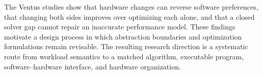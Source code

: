 The Ventus studies show that hardware changes can reverse software preferences, that changing both sides improves over optimizing each alone, and that a closed solver gap cannot repair an inaccurate performance model. These findings motivate a design process in which abstraction boundaries and optimization formulations remain revisable. The resulting research direction is a systematic route from workload semantics to a matched algorithm, executable program, software--hardware interface, and hardware organization.
